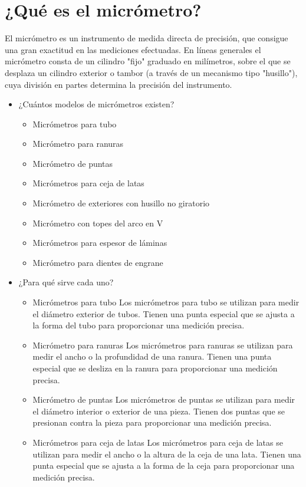 \documentclass{article}
\theoremstyle{mytheoremstyle}
\theoremstyle{mytheoremstyle}
\theoremstyle{myproblemstyle}
\begin{document}
\section{¿Qué es el micrómetro?}
El micrómetro es un instrumento
de medida directa de precisión, que consigue una
gran exactitud en las mediciones efectuadas. En líneas
generales el micrómetro consta de un cilindro "fijo"
graduado en milímetros, sobre el que se desplaza un
cilindro exterior o tambor (a través de un mecanismo
tipo "husillo"), cuya división en partes determina la precisión
del instrumento.
\begin{itemize}
	\item¿Cuántos modelos de micrómetros existen?
	      \begin{itemize}
		      \item Micrómetros para tubo
		      \item Micrómetro para ranuras
		      \item Micrómetro de puntas
		      \item Micrómetros para ceja de latas
		      \item Micrómetro de exteriores con husillo no giratorio
		      \item Micrómetro con topes del arco en V
		      \item Micrómetros para espesor de láminas
		      \item Micrómetro para dientes de engrane
	      \end{itemize}
	      \newpage
	\item¿Para qué sirve cada uno?
	      \begin{itemize}
		      \item Micrómetros para tubo\newline
		            Los micrómetros para tubo se utilizan para medir el diámetro exterior de tubos. Tienen una punta especial que se ajusta a la forma del tubo para proporcionar una medición precisa.

		      \item Micrómetro para ranuras\newline
		            Los micrómetros para ranuras se utilizan para medir el ancho o la profundidad de una ranura. Tienen una punta especial que se desliza en la ranura para proporcionar una medición precisa.
		      \item Micrómetro de puntas\newline
		            Los micrómetros de puntas se utilizan para medir el diámetro interior o exterior de una pieza. Tienen dos puntas que se presionan contra la pieza para proporcionar una medición precisa.
		      \item Micrómetros para ceja de latas \newline
		            Los micrómetros para ceja de latas se utilizan para medir el ancho o la altura de la ceja de una lata. Tienen una punta especial que se ajusta a la forma de la ceja para proporcionar una medición precisa.


\end{itemize}
\end{itemize}
\end{document}
